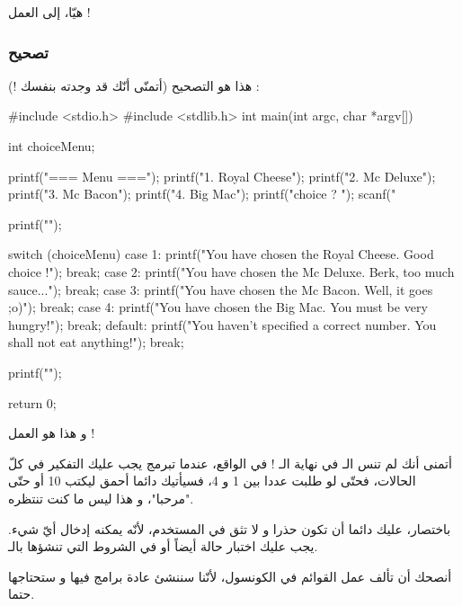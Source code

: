 هيّا، إلى العمل !

\subsubsection{تصحيح}

هذا هو التصحيح (أتمنّى أنّك قد وجدته بنفسك !) :

\begin{Csource}
#include <stdio.h>
#include <stdlib.h>
int main(int argc, char *argv[])
{
	int choiceMenu;
	
	printf("=== Menu ===\n\n");
	printf("1. Royal Cheese\n");
	printf("2. Mc Deluxe\n");
	printf("3. Mc Bacon\n");
	printf("4. Big Mac\n");
	printf("\nYour choice ? ");
	scanf("%
	
	printf("\n");
	
	switch (choiceMenu)
	{
		case 1:
		printf("You have chosen the Royal Cheese. Good choice !");
		break;
		case 2:
		printf("You have chosen the Mc Deluxe. Berk, too much sauce...");
		break;
		case 3:
		printf("You have chosen the Mc Bacon. Well, it goes ;o)");
		break;
		case 4:
		printf("You have chosen the Big Mac. You must be very hungry!");
		break;
		default:
		printf("You haven't specified a correct number. You shall not eat anything!");
		break;
	}
	
	printf("\n\n");
	
	return 0;
}
\end{Csource}
و هذا هو العمل !

أتمنى أنك لم تنس الـ
 في نهاية الـ !
في الواقع، عندما تبرمج يجب عليك التفكير في كلّ الحالات،  فحتّى لو طلبت عددا بين 1 و 4، فسيأتيك دائما أحمق ليكتب 10 أو حتّى "مرحبا"،  و هذا ليس ما كنت تنتظره. 

باختصار، عليك دائما أن تكون حذرا و لا تثق في المستخدم، لأنّه يمكنه إدخال أيّ شيء. يجب عليك اختبار حالة
أيضاً أو 
في الشروط التي تنشؤها بالـ.

\begin{information}
أنصحك أن تألف عمل القوائم في الكونسول، لأنّنا سننشئ عادة برامج فيها و ستحتاجها حتما.
\end{information}
